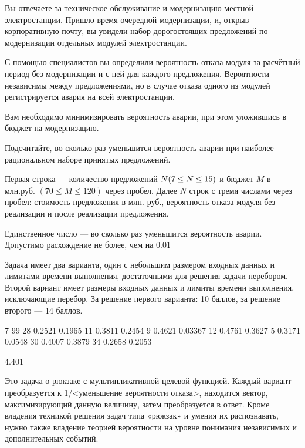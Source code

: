 
Вы отвечаете за техническое обслуживание и модернизацию местной электростанции. Пришло время очередной модернизации, и, открыв корпоративную почту, вы увидели набор дорогостоящих предложений по модернизации отдельных модулей электростанции.

С помощью специалистов вы определили вероятность отказа модуля за расчётный период без модернизации и с ней для каждого предложения. Вероятности независимы между предложениями, но в случае отказа одного из модулей регистрируется авария на всей электростанции.

Вам необходимо минимизировать вероятность аварии, при этом уложившись в бюджет на модернизацию.

Подсчитайте, во сколько раз уменьшится вероятность аварии при наиболее рациональном наборе принятых предложений.


Первая строка — количество предложений $N\space(7\leq N \leq 15)$ и бюджет $M$  в млн.руб. $(70\leq M \leq 120)$ через пробел. Далее $N$ строк с тремя числами через пробел: стоимость предложения в млн. руб., вероятность отказа модуля без реализации и после реализации предложения.

\outputfmtSection

Единственное число — во сколько раз уменьшится вероятность аварии. Допустимо расхождение не более, чем на 0.01

\markSection

Задача имеет два варианта, один с небольшим размером входных данных и лимитами времени выполнения, достаточными для решения задачи перебором. Второй вариант имеет размеры входных данных и лимиты времени выполнения, исключающие перебор. За решение первого варианта: 10 баллов, за решение второго — 14 баллов.


\begin{myverbbox}[\small]{\vinput}
    7 99
    28 0.2521 0.1965
    11 0.3811 0.2454
    9 0.4621 0.03367
    12 0.4761 0.3627
    5 0.3171 0.0548
    30 0.4007 0.3879
    34 0.2658 0.2053
\end{myverbbox}
\begin{myverbbox}[\small]{\voutput}
    4.401
\end{myverbbox}

\solutionSection

Это задача о рюкзаке с мультипликативной целевой функцией. Каждый вариант преобразуется к 1/<уменьшение вероятности отказа>, находится вектор, максимизирующий данную величину, затем преобразуется в ответ. Кроме владения техникой решения задач типа «рюкзак» и умения их распознавать, нужно также владение теорией вероятности на уровне понимания независимых и дополнительных событий.

